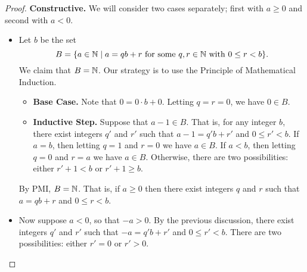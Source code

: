\begin{proof}
\textbf{Constructive.} We will consider two cases separately; first with \(a \geq 0\) and second with \(a < 0\).

\begin{itemize}
\item Let \(b\) be the set \[ B = \{ a \in \mathbb{N} \mid a = qb + r\ \mathrm{for\ some}\ q,r \in \mathbb{N}\ \mathrm{with}\ 0 \leq r < b \}. \]
We claim that \(B = \mathbb{N}\).
Our strategy is to use the Principle of Mathematical Induction.
\begin{itemize}
\item \textbf{Base Case.} Note that \(0 = 0 \cdot b + 0\).
Letting \(q = r = 0\), we have \(0 \in B\).
\item \textbf{Inductive Step.} Suppose that \(a-1 \in B\).
That is, for any integer \(b\), there exist integers \(q'\) and \(r'\) such that \(a-1 = q'b + r'\) and \(0 \leq r' < b\).
If \(a = b\), then letting \(q = 1\) and \(r = 0\) we have \(a \in B\).
If \(a < b\), then letting \(q = 0\) and \(r = a\) we have \(a \in B\).
Otherwise, there are two possibilities: either \(r'+1 < b\) or \(r'+1 \geq b\).
\end{itemize}
By PMI, \(B = \mathbb{N}\).
That is, if \(a \geq 0\) then there exist integers \(q\) and \(r\) such that \(a = qb + r\) and \(0 \leq r < b\).

\item Now suppose \(a < 0\), so that \(-a > 0\).
By the previous discussion, there exist integers \(q'\) and \(r'\) such that \(-a = q'b + r'\) and \(0 \leq r' < b\).
There are two possibilities: either \(r' = 0\) or \(r' > 0\).
\end{itemize}
\end{proof}

